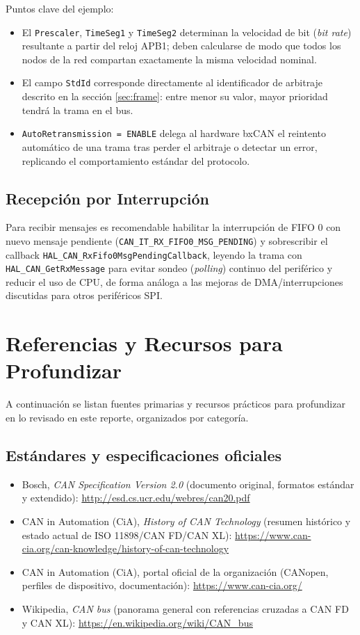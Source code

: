 \documentclass[pdflatex,sn-mathphys-num]{sn-jnl}%
\begin{document}
Puntos clave del ejemplo:
\begin{itemize}
    \item El \texttt{Prescaler}, \texttt{TimeSeg1} y \texttt{TimeSeg2} determinan la velocidad de bit (\textit{bit rate}) resultante a partir del reloj APB1; deben calcularse de modo que todos los nodos de la red compartan exactamente la misma velocidad nominal.
    \item El campo \texttt{StdId} corresponde directamente al identificador de arbitraje descrito en la sección \ref{sec:frame}: entre menor su valor, mayor prioridad tendrá la trama en el bus.
    \item \texttt{AutoRetransmission = ENABLE} delega al hardware bxCAN el reintento automático de una trama tras perder el arbitraje o detectar un error, replicando el comportamiento estándar del protocolo.
\end{itemize}

\subsection{Recepción por Interrupción}
Para recibir mensajes es recomendable habilitar la interrupción de FIFO 0 con nuevo mensaje pendiente (\texttt{CAN\_IT\_RX\_\allowbreak FIFO0\_MSG\_\allowbreak PENDING}) y sobrescribir el callback \texttt{HAL\_CAN\_RxFifo0\allowbreak MsgPendingCallback}, leyendo la trama con \texttt{HAL\_CAN\_\allowbreak GetRxMessage} para evitar sondeo (\textit{polling}) continuo del periférico y reducir el uso de CPU, de forma análoga a las mejoras de DMA/interrupciones discutidas para otros periféricos SPI.

\section{Referencias y Recursos para Profundizar}\label{sec:references}
A continuación se listan fuentes primarias y recursos prácticos para profundizar en lo revisado en este reporte, organizados por categoría.

\subsection{Estándares y especificaciones oficiales}
\begin{itemize}
    \item Bosch, \textit{CAN Specification Version 2.0} (documento original, formatos estándar y extendido): \url{http://esd.cs.ucr.edu/webres/can20.pdf}
    \item CAN in Automation (CiA), \textit{History of CAN Technology} (resumen histórico y estado actual de ISO 11898/CAN FD/CAN XL): \url{https://www.can-cia.org/can-knowledge/history-of-can-technology}
    \item CAN in Automation (CiA), portal oficial de la organización (CANopen, perfiles de dispositivo, documentación): \url{https://www.can-cia.org/}
    \item Wikipedia, \textit{CAN bus} (panorama general con referencias cruzadas a CAN FD y CAN XL): \url{https://en.wikipedia.org/wiki/CAN_bus}
\end{itemize}
\end{document}
